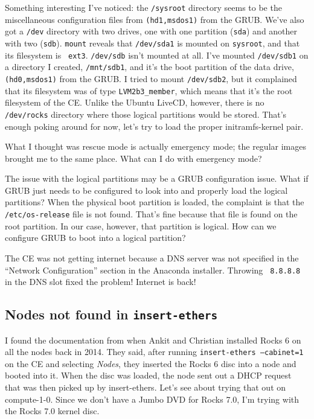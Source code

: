 \documentclass[12pt]{article}
\begin{document}
\qq Something interesting I've noticed: the {\tt /sysroot} directory seems to be
the miscellaneous configuration files from {\tt (hd1,msdos1)} from the
GRUB. We've also got a {\tt /dev} directory with two drives, one with one
partition ({\tt sda}) and another with two ({\tt sdb}). {\tt mount} reveals that
{\tt /dev/sda1} is mounted on {\tt sysroot}, and that its filesystem is {\tt
  ext3}. {\tt /dev/sdb} isn't mounted at all. I've mounted {\tt /dev/sdb1} on a
directory I created, {\tt /mnt/sdb1}, and it's the boot partition of the data
drive, {\tt (hd0,msdos1)} from the GRUB. I tried to mount {\tt /dev/sdb2}, but
it complained that its filesystem was of type {\tt LVM2b3\_member}, which means
that it's the root filesystem of the CE. Unlike the Ubuntu LiveCD, however,
there is no {\tt /dev/rocks} directory where those logical partitions would be
stored. That's enough poking around for now, let's try to load the proper
initramfs-kernel pair.

\qq What I thought was rescue mode is actually emergency mode; the regular
images brought me to the same place. What can I do with emergency mode?

\qq The issue with the logical partitions may be a GRUB configuration
issue. What if GRUB just needs to be configured to look into and properly load
the logical partitions? When the physical boot partition is loaded, the
complaint is that the {\tt /etc/os-release} file is not found. That's fine
because that file is found on the root partition. In our case, however, that
partition is logical. How can we configure GRUB to boot into a logical
partition?

\begin{tcolorbox}[title=RESOLUTION, colback=white, colframe=green!40!black]
  The CE was not getting internet because a DNS server was not specified in the
  ``Network Configuration'' section in the Anaconda installer. Throwing {\tt
    8.8.8.8} in the DNS slot fixed the problem! Internet is back!
\end{tcolorbox}

\subsection{Nodes not found in {\tt insert-ethers}}

\qq I found the documentation from when Ankit and Christian installed Rocks 6 on
all the nodes back in 2014. They said, after running {\tt insert-ethers
  --cabinet=1} on the CE and selecting \textit{Nodes}, they inserted the Rocks 6
disc into a node and booted into it. When the disc was loaded, the node sent out
a DHCP request that was then picked up by insert-ethers. Let's see about trying
that out on compute-1-0. Since we don't have a Jumbo DVD for Rocks 7.0, I'm
trying with the Rocks 7.0 kernel disc. 
\end{document}
